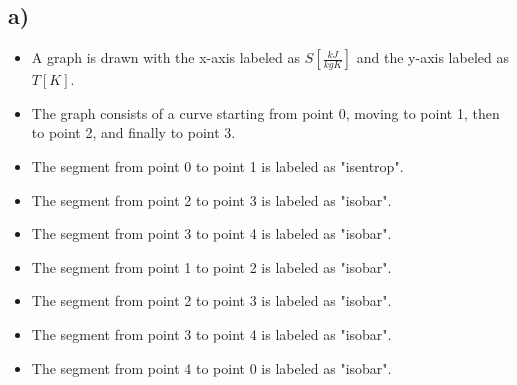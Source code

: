 

\subsection*{a)}

\begin{itemize}
    \item A graph is drawn with the x-axis labeled as $S \left[ \frac{kJ}{kgK} \right]$ and the y-axis labeled as $T \left[ K \right]$.
    \item The graph consists of a curve starting from point 0, moving to point 1, then to point 2, and finally to point 3.
    \item The segment from point 0 to point 1 is labeled as "isentrop".
    \item The segment from point 2 to point 3 is labeled as "isobar".
    \item The segment from point 3 to point 4 is labeled as "isobar".
    \item The segment from point 1 to point 2 is labeled as "isobar".
    \item The segment from point 2 to point 3 is labeled as "isobar".
    \item The segment from point 3 to point 4 is labeled as "isobar".
    \item The segment from point 4 to point 0 is labeled as "isobar".
\end{itemize}